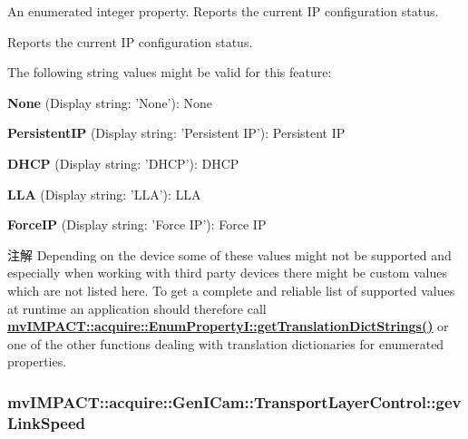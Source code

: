 An enumerated integer property. Reports the current I\+P configuration status. 

Reports the current I\+P configuration status.

The following string values might be valid for this feature\+:
\begin{DoxyItemize}
\item {\bfseries None} (Display string\+: 'None')\+: None
\item {\bfseries Persistent\+I\+P} (Display string\+: 'Persistent I\+P')\+: Persistent I\+P
\item {\bfseries D\+H\+C\+P} (Display string\+: 'D\+H\+C\+P')\+: D\+H\+C\+P
\item {\bfseries L\+L\+A} (Display string\+: 'L\+L\+A')\+: L\+L\+A
\item {\bfseries Force\+I\+P} (Display string\+: 'Force I\+P')\+: Force I\+P
\end{DoxyItemize}

\begin{DoxyNote}{注解}
Depending on the device some of these values might not be supported and especially when working with third party devices there might be custom values which are not listed here. To get a complete and reliable list of supported values at runtime an application should therefore call {\bfseries \hyperlink{classmv_i_m_p_a_c_t_1_1acquire_1_1_enum_property_i_a0ba6ccbf5ee69784d5d0b537924d26b6}{mv\+I\+M\+P\+A\+C\+T\+::acquire\+::\+Enum\+Property\+I\+::get\+Translation\+Dict\+Strings()}} or one of the other functions dealing with translation dictionaries for enumerated properties. 
\end{DoxyNote}
\hypertarget{classmv_i_m_p_a_c_t_1_1acquire_1_1_gen_i_cam_1_1_transport_layer_control_aeac93feac8dfefc51bf1f699f82bc329}{
\subsubsection[{gev\+Link\+Speed}]{ mv\+I\+M\+P\+A\+C\+T\+::acquire\+::\+Gen\+I\+Cam\+::\+Transport\+Layer\+Control\+::gev\+Link\+Speed}}\label{classmv_i_m_p_a_c_t_1_1acquire_1_1_gen_i_cam_1_1_transport_layer_control_aeac93feac8dfefc51bf1f699f82bc329}


